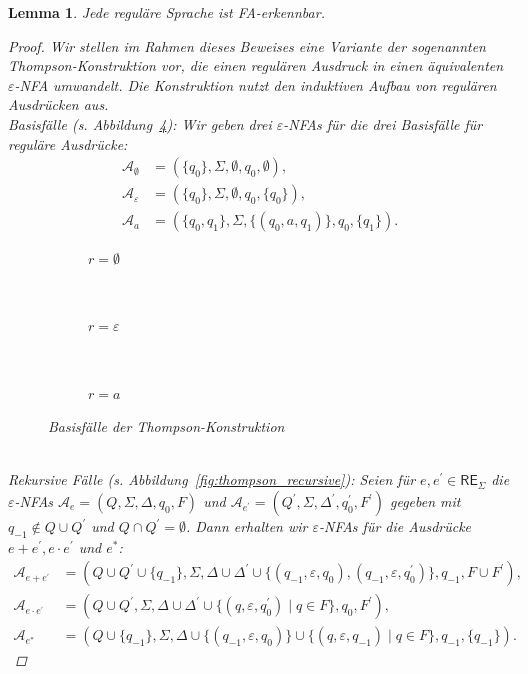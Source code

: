\documentclass[11pt, a4paper]{article}
\theoremstyle{definition}
\theoremstyle{plain}
\newtheorem{lemma}[definition]{Lemma}
\numberwithin{equation}{section}
\begin{document}
\begin{lemma}
	Jede reguläre Sprache ist FA-erkennbar.
	\begin{proof}
		Wir stellen im Rahmen dieses Beweises eine Variante der sogenannten Thompson-Konstruktion vor, die einen regulären Ausdruck in einen äquivalenten \( \varepsilon \)-NFA umwandelt. Die Konstruktion nutzt den induktiven Aufbau von regulären Ausdrücken aus.\\
		Basisfälle (s. Abbildung~\ref{fig:thompson_basic}): 
		Wir geben drei \(\varepsilon\)-NFAs für die drei Basisfälle für reguläre Ausdrücke: 
		\begin{align*}
			\mathcal{A}_\emptyset &= (\{q_0\}, \Sigma, \emptyset, q_0, \emptyset),\\
			\mathcal{A}_\varepsilon &= (\{q_0\}, \Sigma, \emptyset, q_0, \{q_0\}),\\
			\mathcal{A}_a &= (\{q_0, q_1\}, \Sigma, \{(q_0, a, q_1)\}, q_0, \{q_1\}).
		\end{align*}
		\begin{figure}
			\centering
			\begin{subfigure}[b]{.25\textwidth}
				\centering
				
				\caption{\( r = \emptyset \)}
				\label{fig:thompson_empty}
			\end{subfigure}~
			\begin{subfigure}[b]{.25\textwidth}
				\centering
				
				\caption{\( r = \varepsilon \)}
				\label{fig:thompson_eps}
			\end{subfigure}~
			\begin{subfigure}[b]{.4\textwidth}
				\centering
				
				\caption{\( r = a \)}
				\label{fig:thompson_symbol}
			\end{subfigure}
			\caption{Basisfälle der Thompson-Konstruktion}
			\label{fig:thompson_basic}
		\end{figure}\\
		Rekursive Fälle (s. Abbildung~\ref{fig:thompson_recursive}):
		Seien für \( e, e^\prime \in \mathsf{RE}_\Sigma \) die \(\varepsilon\)-NFAs \( \mathcal{A}_e = (Q, \Sigma, \Delta, q_0, F) \) und \( \mathcal{A}_{e^\prime} = (Q^\prime, \Sigma, \Delta^\prime, q_0^\prime, F^\prime) \) gegeben mit \( q_{-1} \notin Q \cup Q^\prime \) und \( Q \cap Q^\prime = \emptyset \). Dann erhalten wir \(\varepsilon\)-NFAs für die Ausdrücke \( e+e^\prime, e \cdot e^\prime\) und \( e^\ast \):
		\begin{align*}
			\mathcal{A}_{e+e^\prime} &= (Q \cup Q^\prime \cup \{q_{-1}\}, \Sigma, \Delta \cup \Delta^\prime \cup \{(q_{-1}, \varepsilon, q_0), (q_{-1}, \varepsilon, q_0^\prime)\}, q_{-1}, F \cup F^\prime),\\
			\mathcal{A}_{e \cdot e^\prime} &= (Q \cup Q^\prime, \Sigma, \Delta \cup \Delta^\prime \cup \{(q, \varepsilon, q_0^\prime) \mid q \in F \}, q_0, F^\prime),\\
			\mathcal{A}_{e^\ast} &= (Q \cup \{q_{-1}\}, \Sigma, \Delta \cup \{(q_{-1}, \varepsilon, q_0)\} \cup \{(q, \varepsilon, q_{-1}) \mid q \in F \}, q_{-1}, \{q_{-1}\}).
		\end{align*}
		

\end{proof}
\end{lemma}
\end{document}
